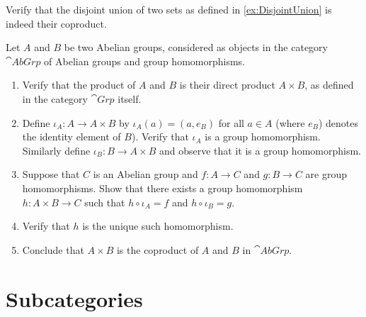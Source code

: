 
\begin{Exercise}
Verify that the disjoint union of two sets as defined in \cref{ex:DisjointUnion} is indeed their coproduct.
\end{Exercise}

\begin{Exercise}
Let $A$ and $B$ be two Abelian groups, considered as objects in the category $\cat{AbGrp}$ of Abelian groups and group homomorphisms.
\begin{enumerate}
\item Verify that the product of $A$ and $B$ is their direct product $A \times B$, as defined in the category $\cat{Grp}$ itself.

\item Define $\iota_A \colon A \to A \times B$ by $\iota_A(a) = (a, e_B)$ for all $a \in A$ (where $e_B$) denotes the identity element of $B$). Verify that $\iota_A$ is a group homomorphism. Similarly define $\iota_B \colon B \to A \times B$ and observe that it is a group homomorphism.

\item Suppose that $C$ is an Abelian group and $f \colon A \to C$ and $g \colon B \to C$ are group homomorphisms. Show that there exists a group homomorphism $h \colon A \times B \to C$ such that $h \circ \iota_A = f$ and $h \circ \iota_B = g$.


\item Verify that $h$ is the unique such homomorphism.

\item Conclude that $A \times B$ is the coproduct of $A$ and $B$ in $\cat{AbGrp}$.
\end{enumerate}
\end{Exercise}

\section{Subcategories}

